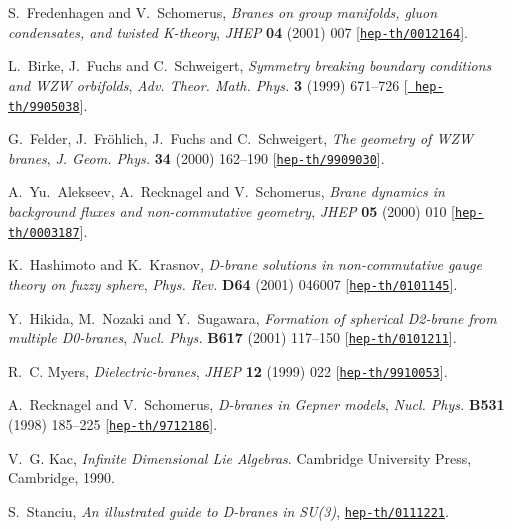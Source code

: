 \documentclass[12pt,a4paper]{article}
\begin{document}
\begin{thebibliography}{10}
S.~Fredenhagen and V.~Schomerus, {\it Branes on group manifolds, gluon
  condensates, and twisted {K-theory}},  {\em JHEP} {\bf 04} (2001) 007
  [\href{http://arXiv.org/abs/hep-th/0012164}{{\tt hep-th/0012164}}].

L.~Birke, J.~Fuchs and C.~Schweigert, {\it Symmetry breaking boundary
  conditions and {WZW} orbifolds},  {\em Adv. Theor. Math. Phys.} {\bf 3}
  (1999) 671--726 [\href{http://arXiv.org/abs/hep-th/9905038}{{\tt
  hep-th/9905038}}].

G.~Felder, J.~{Fr\"ohlich}, J.~Fuchs and C.~Schweigert, {\it The geometry of
  {WZW} branes},  {\em J. Geom. Phys.} {\bf 34} (2000) 162--190
  [\href{http://arXiv.org/abs/hep-th/9909030}{{\tt hep-th/9909030}}].

A.~Yu.~Alekseev, A.~Recknagel and V.~Schomerus, {\it Brane dynamics in
  background fluxes and non-commutative geometry},  {\em JHEP} {\bf 05} (2000)
  010 [\href{http://arXiv.org/abs/hep-th/0003187}{{\tt hep-th/0003187}}].

K.~Hashimoto and K.~Krasnov, {\it D-brane solutions in non-commutative gauge
  theory on fuzzy sphere},  {\em Phys. Rev.} {\bf D64} (2001) 046007
  [\href{http://arXiv.org/abs/hep-th/0101145}{{\tt hep-th/0101145}}].

Y.~Hikida, M.~Nozaki and Y.~Sugawara, {\it Formation of spherical {D2-brane}
  from multiple {D0-branes}},  {\em Nucl. Phys.} {\bf B617} (2001) 117--150
  [\href{http://arXiv.org/abs/hep-th/0101211}{{\tt hep-th/0101211}}].

R.~C. Myers, {\it Dielectric-branes},  {\em JHEP} {\bf 12} (1999) 022
  [\href{http://arXiv.org/abs/hep-th/9910053}{{\tt hep-th/9910053}}].

A.~Recknagel and V.~Schomerus, {\it D-branes in {Gepner} models},  {\em Nucl.
  Phys.} {\bf B531} (1998) 185--225
  [\href{http://arXiv.org/abs/hep-th/9712186}{{\tt hep-th/9712186}}].

V.~G. Kac, {\em Infinite Dimensional {Lie} Algebras}.
\newblock Cambridge University Press, Cambridge, 1990.

S.~Stanciu, {\it An illustrated guide to {D-branes} in {SU(3)}},
  \href{http://arXiv.org/abs/hep-th/0111221}{{\tt hep-th/0111221}}.


\end{thebibliography}
\end{document}
